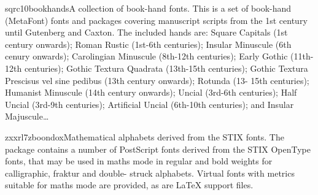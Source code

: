 \documentclass{ddltxtyp}
\begin{document}

\begin{package}{sqrc10}{bookhands}{A collection of book-hand fonts.}
This is a set of book-hand (MetaFont) fonts and packages
covering manuscript scripts from the 1st century until
Gutenberg and Caxton. The included hands are: Square Capitals
(1st century onwards); Roman Rustic (1st-6th centuries);
Insular Minuscule (6th cenury onwards); Carolingian Minuscule
(8th-12th centuries); Early Gothic (11th-12th centuries);
Gothic Textura Quadrata (13th-15th centuries); Gothic Textura
Prescisus vel sine pedibus (13th century onwards); Rotunda (13-
15th centuries); Humanist Minuscule (14th century onwards);
Uncial (3rd-6th centuries); Half Uncial (3rd-9th centuries);
Artificial Uncial (6th-10th centuries); and Insular Majuscule\ldots
\end{package}

\begin{package}{zxxrl7z}{boondox}{Mathematical alphabets derived from the STIX fonts.}
The package contains a number of PostScript fonts derived from
the STIX OpenType fonts, that may be used in maths mode in
regular and bold weights for calligraphic, fraktur and double-
struck alphabets. Virtual fonts with metrics suitable for maths
mode are provided, as are {\LaTeX} support files.
\end{package}
\end{document}
